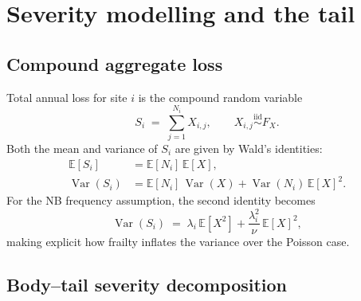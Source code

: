 \documentclass[11pt,a4paper]{article}
\let\origsection\section
\renewcommand{\section}{\clearpage\origsection}
\theoremstyle{ia}
\newcommand{\E}{\mathbb{E}}
\newcommand{\Var}{\operatorname{Var}}
\newcommand{\1}{\mathbf{1}}
\begin{document}
\section{Severity modelling and the tail}\label{sec:severity}

\subsection{Compound aggregate loss}

Total annual loss for site $i$ is the compound random variable
\begin{equation}\label{eq:S}
   S_i \;=\; \sum_{j=1}^{N_i} X_{i,j},\qquad
   X_{i,j}\stackrel{\mathrm{iid}}{\sim}F_X.
\end{equation}
Both the mean and variance of $S_i$ are given by
Wald's identities:
\begin{align}
   \E[S_i] &= \E[N_i]\,\E[X],\\
   \Var(S_i) &= \E[N_i]\,\Var(X) + \Var(N_i)\,\E[X]^2.
\end{align}
For the NB frequency assumption, the second identity becomes
\begin{equation}\label{eq:varS-NB}
   \Var(S_i) \;=\; \lambda_i\,\E[X^2] +
                  \frac{\lambda_i^2}{\nu}\,\E[X]^2 ,
\end{equation}
making explicit how frailty inflates the variance over the Poisson case.

\subsection{Body--tail severity decomposition}
\end{document}
